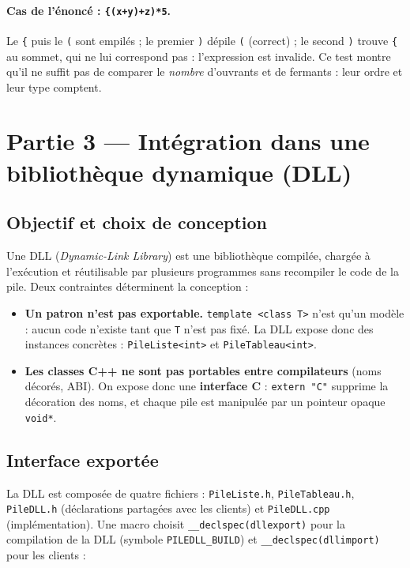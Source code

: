 \documentclass[11pt,a4paper]{article}
\begin{document}
\paragraph{Cas de l'énoncé : \texttt{\{(x+y)+z)*5}.} Le \texttt{\{} puis le \texttt{(} sont empilés ; le premier \texttt{)} dépile \texttt{(} (correct) ; le second \texttt{)} trouve \texttt{\{} au sommet, qui ne lui correspond pas : l'expression est invalide. Ce test montre qu'il ne suffit pas de comparer le \emph{nombre} d'ouvrants et de fermants : leur ordre et leur type comptent.

\section{Partie 3 --- Intégration dans une bibliothèque dynamique (DLL)}

\subsection{Objectif et choix de conception}

Une DLL (\emph{Dynamic-Link Library}) est une bibliothèque compilée, chargée à l'exécution et réutilisable par plusieurs programmes sans recompiler le code de la pile. Deux contraintes déterminent la conception :

\begin{itemize}[nosep]
    \item \textbf{Un patron n'est pas exportable.} \texttt{template <class T>} n'est qu'un modèle : aucun code n'existe tant que \texttt{T} n'est pas fixé. La DLL expose donc des instances concrètes : \texttt{PileListe<int>} et \texttt{PileTableau<int>}.
    \item \textbf{Les classes C++ ne sont pas portables entre compilateurs} (noms décorés, ABI). On expose donc une \textbf{interface C} : \texttt{extern "C"} supprime la décoration des noms, et chaque pile est manipulée par un pointeur opaque \texttt{void*}.
\end{itemize}

\subsection{Interface exportée}

La DLL est composée de quatre fichiers : \texttt{PileListe.h}, \texttt{PileTableau.h}, \texttt{PileDLL.h} (déclarations partagées avec les clients) et \texttt{PileDLL.cpp} (implémentation). Une macro choisit \texttt{\_\_declspec(dllexport)} pour la compilation de la DLL (symbole \texttt{PILEDLL\_BUILD}) et \texttt{\_\_declspec(dllimport)} pour les clients :
\end{document}
